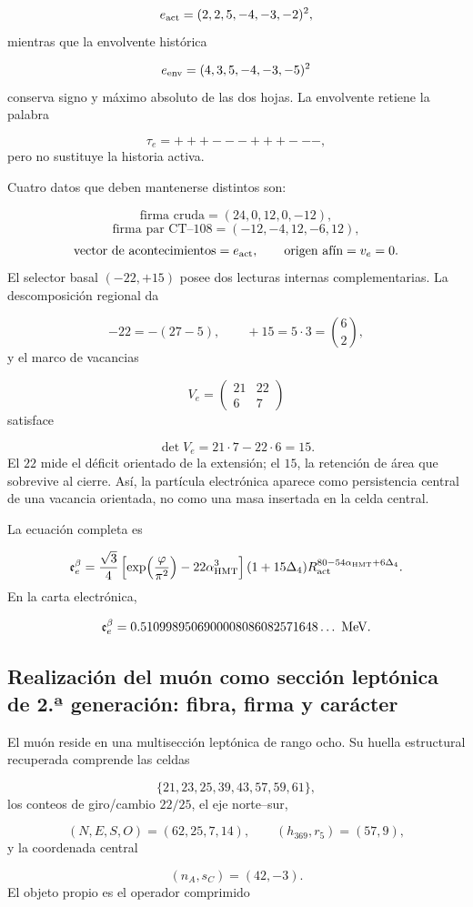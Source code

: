 \[
 e_{\rm act}=(2,2,5,-4,-3,-2)^2,
\]
mientras que la envolvente histórica

\[
 e_{\rm env}=(4,3,5,-4,-3,-5)^2
\]
conserva signo y máximo absoluto de las dos hojas. La envolvente retiene la palabra

\[
 \tau_e=+++---+++---,
\]
pero no sustituye la historia activa.

Cuatro datos que deben mantenerse distintos son:

\[
 \text{firma cruda}=(24,0,12,0,-12),
\]
\[
 \text{firma par CT--108}=(-12,-4,12,-6,12),
\]
\[
 \text{vector de acontecimientos}=e_{\rm act},
\qquad
 \text{origen afín}=v_e=0.
\]
El selector basal \((-22,+15)\) posee dos lecturas internas complementarias. La descomposición regional da

\[
 -22=-(27-5),\qquad +15=5\cdot3=\binom62,
\]
y el marco de vacancias

\[
 V_e=
 \begin{pmatrix}
 21&22\\
 6&7
 \end{pmatrix}
\]
satisface

\[
 \det V_e=21\cdot7-22\cdot6=15.
\]
El \(22\) mide el déficit orientado de la extensión; el \(15\), la retención de área que sobrevive al cierre. Así, la partícula electrónica aparece como persistencia central de una vacancia orientada, no como una masa insertada en la celda central.

La ecuación completa es

\[
 \mathfrak e_e^\beta=
 \frac{\sqrt3}{4}
 \left[
 \exp\!\left(\frac{\varphi}{\pi^2}\right)
 -22\alpha_{\rm HMT}^{3}
 \right]
 (1+15\Delta_4)
 R_{\rm act}^{80-54\alpha_{\rm HMT}+6\Delta_4}.
\]
En la carta electrónica,

\[
 \mathfrak e_e^\beta
 =0.5109989506900008086082571648\ldots\ {\rm MeV}.
\]
\subsection{Realización del muón como sección leptónica de 2.ª generación: fibra, firma y carácter}
El muón reside en una multisección leptónica de rango ocho. Su huella estructural recuperada comprende las celdas

\[
 \{21,23,25,39,43,57,59,61\},
\]
los conteos de giro/cambio \(22/25\), el eje norte--sur,

\[
 (N,E,S,O)=(62,25,7,14),
\qquad
 (h_{369},r_5)=(57,9),
\]
y la coordenada central

\[
 (n_A,s_C)=(42,-3).
\]
El objeto propio es el operador comprimido


